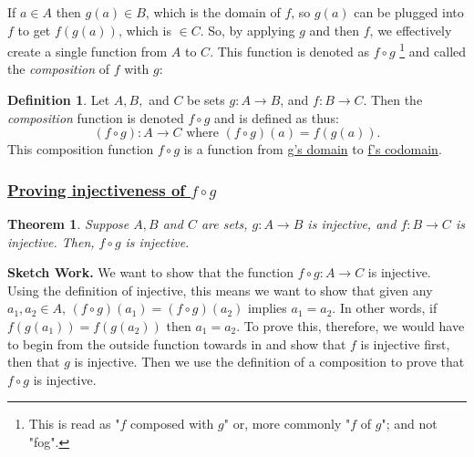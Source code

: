 \documentclass{amsart}
\newtheorem{thrm}{Theorem}
\theoremstyle{definition}
\newtheorem*{dfn}{Definition}
\theoremstyle{definition}
\theoremstyle{remark}
\begin{document}
If $a\in A$ then $g(a)\in B$, which is the domain of $f$, so $g(a)$ can be plugged into $f$ to get $f(g(a))$, which is $\in C$. So, by applying $g$ and then $f$, we effectively create a single function from $A$ to $C$. This function is denoted as $f \circ g$ \footnote{This is read as "$f$ composed with $g$" or, more commonly "$f$ of $g$"; and not "fog".} and called the \emph{composition} of $f$ with $g$:

\bigskip
\begin{center}
\end{center}
\bigskip

\begin{dfn}
      Let $A, B,$ and $C$ be sets $g:A\rightarrow B$, and $f:B\rightarrow C$. Then the \emph{composition} function is denoted $f \circ g$ and is defined as thus:
      \[(f \circ g): A\rightarrow C \text{ where } (f \circ g)(a)=f(g(a)).  \]
      This composition function $f\circ g$ is a function from \underline{g's domain} to \underline{f's codomain}.
\end{dfn}




\bigskip \bigskip

\subsubsection{\underline{Proving injectiveness of $f\circ g$}}\hspace*{\fill}
\medskip


\begin{thrm}
      Suppose $A, B$ and $C$ are sets, $g:A\rightarrow B$ is injective, and $f:B\rightarrow C$ is injective. Then, $f\circ g$ is injective.
\end{thrm}

\noindent \textbf{Sketch Work.} We want to show that the function $f \circ g:A\rightarrow C$ is injective. Using the definition of injective, this means we want to show that given any $a_1,a_2\in A$, $(f\circ g)(a_1) = (f\circ g)(a_2)$ implies $a_1=a_2$. In other words, if $f(g(a_1))=f(g(a_2))$ then $a_1=a_2$. To prove this, therefore, we would have to begin from the outside function towards in and show that $f$ is injective first, then that $g$ is injective. Then we use the definition of a composition to prove that $f\circ g$ is injective.
\end{document}
